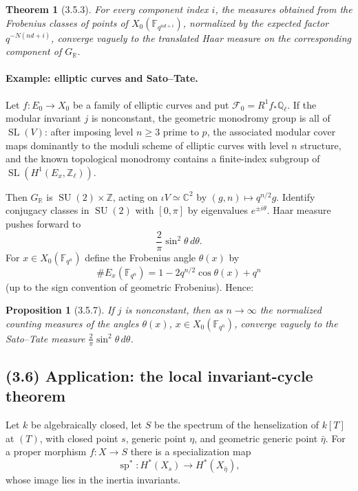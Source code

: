 \documentclass[11pt]{article}
\newtheorem{theorem}{Theorem}
\newtheorem{proposition}{Proposition}
\theoremstyle{remark}
\newcommand{\Ql}{\mathbb{Q}_\ell}
\newcommand{\CC}{\mathbb{C}}
\newcommand{\RR}{\mathbb{R}}
\begin{document}
\begin{theorem}[3.5.3]
For every component index $i$, the measures obtained from the Frobenius classes of points of $X_0(\mathbb{F}_{q^{nd+i}})$, normalized by the expected factor $q^{-N(nd+i)}$, converge vaguely to the translated Haar measure on the corresponding component of $G_\RR$.
\end{theorem}

\paragraph{Example: elliptic curves and Sato--Tate.}
Let $f:E_0\to X_0$ be a family of elliptic curves and put $\mathcal F_0=R^1f_{*}\Ql$. If the modular invariant $j$ is nonconstant, the geometric monodromy group is all of $\operatorname{SL}(V)$: after imposing level $n\ge3$ prime to $p$, the associated modular cover maps dominantly to the moduli scheme of elliptic curves with level $n$ structure, and the known topological monodromy contains a finite-index subgroup of $\operatorname{SL}(H^1(E_x,\mathbb Z_\ell))$.

Then $G_\RR$ is $\operatorname{SU}(2)\times\mathbb Z$, acting on $\iota V\simeq\CC^2$ by $(g,n)\mapsto q^{n/2}g$. Identify conjugacy classes in $\operatorname{SU}(2)$ with $[0,\pi]$ by eigenvalues $e^{\pm i\theta}$. Haar measure pushes forward to
\[
\frac{2}{\pi}\sin^2\theta\,d\theta.
\]
For $x\in X_0(\mathbb{F}_{q^n})$ define the Frobenius angle $\theta(x)$ by
\[
\#E_x(\mathbb{F}_{q^n})=1-2q^{n/2}\cos\theta(x)+q^n
\]
(up to the sign convention of geometric Frobenius). Hence:
\begin{proposition}[3.5.7]
If $j$ is nonconstant, then as $n\to\infty$ the normalized counting measures of the angles $\theta(x)$, $x\in X_0(\mathbb{F}_{q^n})$, converge vaguely to the Sato--Tate measure $\frac{2}{\pi}\sin^2\theta\,d\theta$.
\end{proposition}

\subsection*{(3.6) Application: the local invariant-cycle theorem}

Let $k$ be algebraically closed, let $S$ be the spectrum of the henselization of $k[T]$ at $(T)$, with closed point $s$, generic point $\eta$, and geometric generic point $\bar\eta$. For a proper morphism $f:X\to S$ there is a specialization map
\[
\operatorname{sp}^*:H^*(X_s)\longrightarrow H^*(X_{\bar\eta}),
\]
whose image lies in the inertia invariants.
\end{document}
